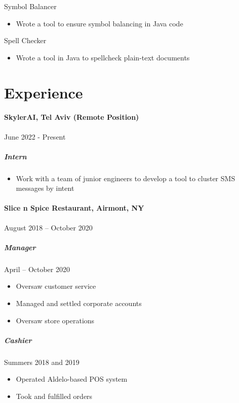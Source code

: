 \documentclass[10pt]{article}
\begin{document}
Symbol Balancer
\begin{itemize}
    \item Wrote a tool to ensure symbol balancing in Java code
\end{itemize}

Spell Checker
\begin{itemize}
    \item Wrote a tool in Java to spellcheck plain-text documents
\end{itemize}


\vfill
\section*{Experience}

\paragraph{SkylerAI, Tel Aviv (Remote Position)} \hfill June 2022 - Present
\subparagraph*{Intern}
\begin{itemize}
    \item Work with a team of junior engineers to develop a tool to cluster SMS messages by intent
\end{itemize}

\paragraph*{Slice n Spice Restaurant, Airmont, NY} \hfill August 2018 – October 2020
\subparagraph*{Manager} \hfill April – October 2020
\begin{itemize}
    \item Oversaw customer service
    \item Managed and settled corporate accounts
    \item Oversaw store operations
\end{itemize}
\subparagraph*{Cashier} \hfill Summers 2018 and 2019
\begin{itemize}
    \item Operated Aldelo-based POS system
    \item Took and fulfilled orders
\end{itemize}
\end{document}
